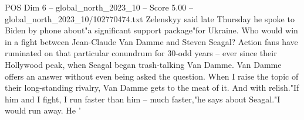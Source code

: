 \begin{textsample}{POS Dim 6 – global\_north\_2023\_10 – Score 5.00 – global\_north\_2023\_10/102770474.txt}
Zelenskyy said late Thursday he spoke to Biden by phone about"a significant support package"for Ukraine.
Who would win in a fight between Jean-Claude Van Damme and Steven Seagal?
Action fans have ruminated on that particular conundrum for 30-odd years -- ever since their Hollywood peak, when Seagal began trash-talking Van Damme.
Van Damme offers an answer without even being asked the question.
When I raise the topic of their long-standing rivalry, Van Damme gets to the meat of it.
And with relish."If him and I fight, I run faster than him -- much faster,"he says about Seagal."I would run away.
He '

\end{textsample}
